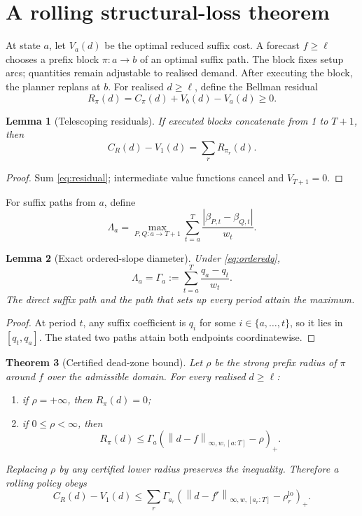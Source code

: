 \documentclass[11pt]{article}
\newtheorem{theorem}{Theorem}[section]
\newtheorem{lemma}[theorem]{Lemma}
\theoremstyle{definition}
\newcommand{\norm}[1]{\left\lVert #1\right\rVert}
\newcommand{\pos}[1]{\left(#1\right)_{+}}
\newcommand{\ellv}{\ell}
\newcommand{\rholo}{\rho^{\mathrm{lo}}}
\begin{document}
\section{A rolling structural-loss theorem}\label{sec:rolling}

At state $a$, let $V_a(d)$ be the optimal reduced suffix cost. A forecast $f\ge\ellv$ chooses a prefix block $\pi:a\to b$ of an optimal suffix path. The block fixes setup arcs; quantities remain adjustable to realised demand. After executing the block, the planner replans at $b$. For realised $d\ge\ellv$, define the Bellman residual
\begin{equation}\label{eq:residual}
R_\pi(d)=C_\pi(d)+V_b(d)-V_a(d)\ge0.
\end{equation}

\begin{lemma}[Telescoping residuals]\label{lem:telescope}
If executed blocks concatenate from 1 to $T+1$, then
\[
C_R(d)-V_1(d)=\sum_r R_{\pi_r}(d).
\]
\end{lemma}

\begin{proof}
Sum \eqref{eq:residual}; intermediate value functions cancel and $V_{T+1}=0$.
\end{proof}

For suffix paths from $a$, define
\[
\Lambda_a=
\max_{P,Q:a\to T+1}
\sum_{t=a}^T\frac{|\beta_{P,t}-\beta_{Q,t}|}{w_t}.
\]

\begin{lemma}[Exact ordered-slope diameter]\label{lem:diameter}
Under \eqref{eq:orderedq},
\begin{equation}\label{eq:gamma}
\Lambda_a=\Gamma_a:=\sum_{t=a}^T\frac{q_a-q_t}{w_t}.
\end{equation}
The direct suffix path and the path that sets up every period attain the maximum.
\end{lemma}

\begin{proof}
At period $t$, any suffix coefficient is $q_i$ for some $i\in\{a,\ldots,t\}$, so it lies in $[q_t,q_a]$. The stated two paths attain both endpoints coordinatewise.
\end{proof}

\begin{theorem}[Certified dead-zone bound]\label{thm:rolling}
Let $\rho$ be the strong prefix radius of $\pi$ around $f$ over the admissible domain. For every realised $d\ge\ellv$:
\begin{enumerate}[label=(\roman*)]
\item if $\rho=+\infty$, then $R_\pi(d)=0$;
\item if $0\le\rho<\infty$, then
\begin{equation}\label{eq:deadzone}
R_\pi(d)\le
\Gamma_a\pos{\norm{d-f}_{\infty,w,[a:T]}-\rho}.
\end{equation}
\end{enumerate}
Replacing $\rho$ by any certified lower radius preserves the inequality. Therefore a rolling policy obeys
\begin{equation}\label{eq:rollingbound}
C_R(d)-V_1(d)
\le
\sum_r\Gamma_{a_r}
\pos{\norm{d-f^r}_{\infty,w,[a_r:T]}-\rholo_r}.
\end{equation}
\end{theorem}
\end{document}
